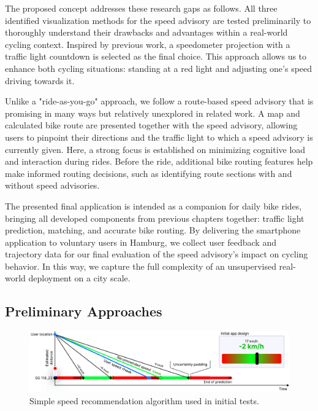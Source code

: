 The proposed concept addresses these research gaps as follows. All three identified visualization methods for the speed advisory are tested preliminarily to thoroughly understand their drawbacks and advantages within a real-world cycling context. Inspired by previous work, a speedometer projection with a traffic light countdown is selected as the final choice. This approach allows us to enhance both cycling situations: standing at a red light and adjusting one's speed driving towards it.

Unlike a "ride-as-you-go" approach, we follow a route-based speed advisory that is promising in many ways but relatively unexplored in related work. A map and calculated bike route are presented together with the speed advisory, allowing users to pinpoint their directions and the traffic light to which a speed advisory is currently given. Here, a strong focus is established on minimizing cognitive load and interaction during rides. Before the ride, additional bike routing features help make informed routing decisions, such as identifying route sections with and without speed advisories. 

The presented final application is intended as a companion for daily bike rides, bringing all developed components from previous chapters together: traffic light prediction, matching, and accurate bike routing. By delivering the smartphone application to voluntary users in Hamburg, we collect user feedback and trajectory data for our final evaluation of the speed advisory's impact on cycling behavior. In this way, we capture the full complexity of an unsupervised real-world deployment on a city scale.

\subsection{Preliminary Approaches}

\begin{figure}[t]
\centering
\includegraphics[width=\linewidth]{images/graph-based-speed-recommendation.pdf}
\caption{Simple speed recommendation algorithm used in initial tests.}
\label{fig:graph-based-speed-recommendation}
\end{figure}

